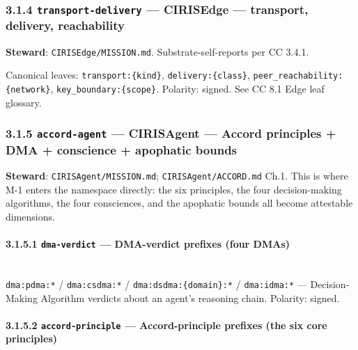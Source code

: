 \documentclass[11pt]{article}
\begin{document}
\subsubsection*{3.1.4 \texttt{transport-delivery} — CIRISEdge — transport, delivery, reachability}


\textbf{Steward}: \texttt{CIRISEdge/MISSION.md}. Substrate-self-reports per CC 3.4.1.


Canonical leaves: \texttt{transport:\{kind\}}, \texttt{delivery:\{class\}}, \texttt{peer\_reachability:\{network\}}, \texttt{key\_boundary:\{scope\}}. Polarity: signed. See CC 8.1 Edge leaf glossary.


\subsubsection*{3.1.5 \texttt{accord-agent} — CIRISAgent — Accord principles + DMA + conscience + apophatic bounds}


\textbf{Steward}: \texttt{CIRISAgent/MISSION.md}; \texttt{CIRISAgent/ACCORD.md} Ch.1. This is where M-1 enters the namespace directly: the six principles, the four decision-making algorithms, the four consciences, and the apophatic bounds all become attestable dimensions.


\paragraph{3.1.5.1 \texttt{dma-verdict} — DMA-verdict prefixes (four DMAs)}\mbox{}\\


\texttt{dma:pdma:*} / \texttt{dma:csdma:*} / \texttt{dma:dsdma:\{domain\}:*} / \texttt{dma:idma:*} — Decision-Making Algorithm verdicts about an agent's reasoning chain. Polarity: signed.


\paragraph{3.1.5.2 \texttt{accord-principle} — Accord-principle prefixes (the six core principles)}\mbox{}\\
\end{document}
